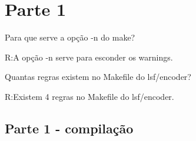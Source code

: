 \documentclass[10pt,a4paper]{article}
\begin{document}
\setlength{\parskip}{0pt}
\setlength{\parsep}{0pt}
\setlength{\headsep}{0pt}
\setlength{\topskip}{0pt}
\setlength{\topmargin}{0pt}
\setlength{\topsep}{0pt}
\setlength{\partopsep}{0pt}


\begin{minipage}{5cm}
  \vspace{2mm}
\end{minipage}

\vspace{-3mm}

\section{Parte 1}
Para que serve a opção -n do make?

R:A opção -n serve para esconder os warnings.

Quantas regras existem no Makefile do lsf/encoder?

R:Existem 4 regras no Makefile do lsf/encoder.
\subsection{Parte 1 - compilação}
\end{document}
